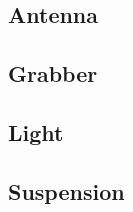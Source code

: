 \newcommand{\ExplodedView}[1]{
 \subsection{#1}
  
}

\ExplodedView{Antenna}
\ExplodedView{Grabber}
\ExplodedView{Light}
\ExplodedView{Suspension}
